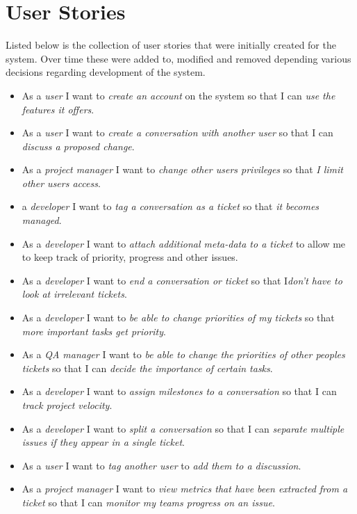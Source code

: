 \documentclass[a4paper]{l3proj}
\begin{document}
\section{User Stories}
\label{userStories}

Listed below is the collection of user stories that were initially created for the system.  Over time these were added to, modified and removed depending various decisions regarding development of the system.

\begin{itemize}
\item As a \textit{user} I want to \textit{create an account} on the system so that I can \textit{use the features it offers}.
\item As a \textit{user} I want to \textit{create a conversation with another user} so that I can \textit{discuss a proposed change}.
\item As a \textit{project manager} I want to \textit{change other users privileges} so that \textit{I limit other users access}.
\item  a \textit{developer} I want to \textit{tag a conversation as a ticket} so that \textit{it becomes managed}.
\item As a \textit{developer} I want to \textit{attach additional meta-data to a ticket} to allow me to keep track of priority, progress and other issues.
\item As a \textit{developer} I want to \textit{end a conversation or ticket} so that I\textit{don't have to look at irrelevant tickets}.
\item As a \textit{developer} I want to \textit{be able to change priorities of my tickets} so that \textit{more important tasks get priority}.
\item As a \textit{QA manager} I want to \textit{be able to change the priorities of other peoples tickets} so that I can \textit{decide the importance of certain tasks}.
\item As a \textit{developer} I want to \textit{assign milestones to a conversation} so that I can \textit{track project velocity}.
\item As a \textit{developer} I want to \textit{split a conversation} so that I can \textit{separate multiple issues if they appear in a single ticket}.
\item As a \textit{user} I want to \textit{tag another user} to \textit{add them to a discussion}.
\item As a \textit{project manager} I want to \textit{view metrics that have been extracted from a ticket} so that I can \textit{monitor my teams progress on an issue}.

\end{itemize}
\end{document}
